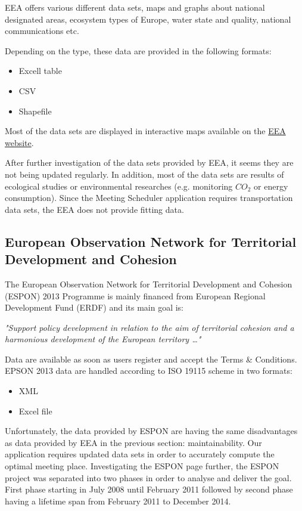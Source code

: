 \documentclass[thesis=M,english]{FITthesis}[2012/10/20]
\begin{document}
EEA offers various different data sets, maps and graphs about national designated areas, ecosystem types of Europe, water state and quality, national communications etc. 

Depending on the type, these data are provided in the following formats:
\begin{itemize}
\item Excell table
\item CSV
\item Shapefile
\end{itemize} 

Most of the data sets are displayed in interactive maps available on the \href{http://www.eea.europa.eu/data-and-maps}{EEA website}.

After further investigation of the data sets provided by EEA, it seems they are not being updated regularly. In addition, most of the data sets are results of ecological studies or environmental researches (e.g. monitoring $CO_{2}$ or energy consumption). Since the Meeting Scheduler application requires transportation data sets, the EEA does not provide fitting data.

\subsection{European Observation Network for Territorial Development and Cohesion}
The European Observation Network for Territorial Development and Cohesion (ESPON) 2013 Programme is mainly financed from European Regional Development Fund (ERDF) and its main goal is:

\textit{"Support policy development in relation to the aim of territorial cohesion and a harmonious development of the European territory \ldots "} \cite{ESPON13}

Data are available as soon as users register and accept the Terms \& Conditions. EPSON 2013 data are handled according to ISO 19115 scheme in two formats:

\begin{itemize}
\item XML
\item Excel file
\end{itemize}

Unfortunately, the data provided by ESPON are having the same disadvantages as data provided by EEA in the previous section: maintainability. Our application requires updated data sets in order to accurately compute the optimal meeting place. Investigating the ESPON page further, the ESPON project was separated into two phases in order to analyse and deliver the goal. First phase starting in July 2008 until February 2011 followed by second phase having a lifetime span from February 2011 to December 2014. 
\end{document}
